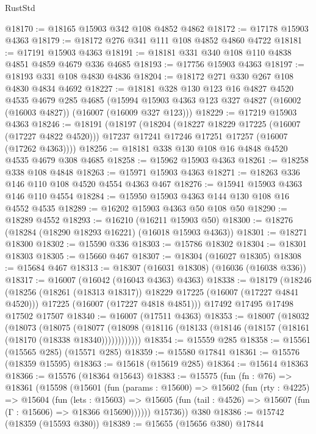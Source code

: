 \begin{lexlean}{RustStd}
\begin{coremodule}
@18170 := @18165 @15903 @342 @108 @4852 @4862
@18172 := @17178 @15903 @4363
@18179 := @18172 @276 @341 @111 @108 @4852 @4860 @4722
@18181 := @17191 @15903 @4363
@18191 := @18181 @331 @340 @108 @110 @4838 @4851 @4859 @4679 @336 @4685
@18193 := @17756 @15903 @4363
@18197 := @18193 @331 @108 @4830 @4836
@18204 := @18172 @271 @330 @267 @108 @4830 @4834 @4692
@18227 := @18181
    @328
    @130
    @123
    @16
    @4827
    @4520
    @4535
    @4679
    @285
    @4685
    (@15994 @15903 @4363 @123 @327 @4827 (@16002 (@16003 @4827)) (@16007 (@16009 @327 @123)))
@18229 := @17219 @15903 @4363
@18246 := @18191
    (@18197
      (@18204
        (@18227 @18229 @17225 (@16007 (@17227 @4822 @4520)))
        @17237
        @17241
        @17246
        @17251
        @17257
        (@16007 (@17262 @4363))))
@18256 := @18181 @338 @130 @108 @16 @4848 @4520 @4535 @4679 @308 @4685
@18258 := @15962 @15903 @4363
@18261 := @18258 @338 @108 @4848
@18263 := @15971 @15903 @4363
@18271 := @18263 @336 @146 @110 @108 @4520 @4554 @4363 @467
@18276 := @15941 @15903 @4363 @146 @110 @4554
@18284 := @15950 @15903 @4363 @144 @130 @108 @16 @4552 @4535
@18289 := @16202 @15903 @4363 @50 @108 @50
@18290 := @18289 @4552
@18293 := @16210 (@16211 @15903 @50)
@18300 := @18276 (@18284 (@18290 @18293 @16221) (@16018 @15903 @4363))
@18301 := @18271 @18300
@18302 := @15590 @336
@18303 := @15786 @18302
@18304 := @18301 @18303
@18305 := @15660 @467
@18307 := @18304 (@16027 @18305)
@18308 := @15684 @467
@18313 := @18307 (@16031 @18308) (@16036 (@16038 @336))
@18317 := @16007 (@16042 (@16043 @4363) @4363)
@18338 := @18179
    (@18246
      (@18256 (@18261 (@18313 @18317)) @18229 @17225 (@16007 (@17227 @4841 @4520)))
      @17225
      (@16007 (@17227 @4818 @4851)))
    @17492
    @17495
    @17498
    @17502
    @17507
@18340 := @16007 (@17511 @4363)
@18353 := @18007
    (@18032
      (@18073
        (@18075
          (@18077 (@18098 (@18116 (@18133 (@18146 (@18157 (@18161 (@18170 (@18338 @18340))))))))))))
@18354 := @15559 @285
@18358 := @15561 (@15565 @285) (@15571 @285)
@18359 := @15580 @17841
@18361 := @15576 (@18359 @15595)
@18363 := @15618 (@15619 @285)
@18364 := @15614 @18363
@18366 := @15576 (@18364 @15643)
@18383 := @15575
    (fun (fn : @76) =>
    @18361
      (@15598
        (@15601
          (fun (params : @15600) =>
          @15602
            (fun (rty : @4225) =>
            @15604
              (fun (lets : @15603) =>
              @15605 (fun (tail : @4526) => @15607 (fun (Γ : @15606) => @18366 @15690))))))
        @15736))
    @380
@18386 := @15742 (@18359 (@15593 @380))
@18389 := @15655 (@15656 @380) @17844

\end{coremodule}
\end{lexlean}
